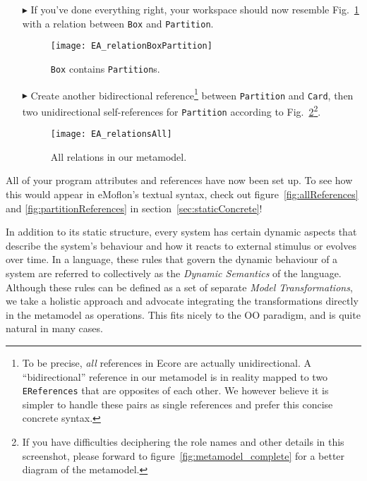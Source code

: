 \begin{enumerate}

\item[$\blacktriangleright$] If you've done everything right, your workspace should now resemble Fig.~\ref{fig:ereference_completed} with a relation between \texttt{Box} and \texttt{Partition}.

\begin{figure}[htbp]
	\centering
  \texttt{[image: EA\_relationBoxPartition]}
	\caption{\texttt{Box} contains \texttt{Partition}s.}
	\label{fig:ereference_completed}
\end{figure}
\FloatBarrier


\item[$\blacktriangleright$] Create another bidirectional reference\footnote{To be precise, \emph{all} references in Ecore are actually unidirectional.
A ``bidirectional'' reference in our metamodel is in reality mapped to two \texttt{EReferences} that are opposites of each other.
We however believe it is simpler to handle these pairs as single references and prefer this concise concrete syntax.} between \texttt{Partition} and \texttt{Card}, then two unidirectional self-references for \texttt{Partition} according to Fig.~\ref{fig:ereferences_all}\footnote{If you have difficulties deciphering the role names and other details in this screenshot, please forward to figure~\ref{fig:metamodel_complete} for a better diagram of the metamodel.}.

\begin{figure}[htbp]
	\centering
  \texttt{[image: EA\_relationsAll]}
	\caption{All relations in our metamodel.}
	\label{fig:ereferences_all}
\end{figure}
\end{enumerate}
\FloatBarrier

All of your program attributes and references have now been set up. To see how this would appear in eMoflon's textual syntax, check out figure~\ref{fig:allReferences} and \ref{fig:partitionReferences} in section~\ref{sec:staticConcrete}!

\vfill
\pagebreak

In addition to its static structure, every system has certain dynamic aspects that describe the system's behaviour and how it reacts to external stimulus or evolves over time.
In a language, these rules that govern the dynamic behaviour of a system are referred to collectively as the \emph{Dynamic Semantics} of the language.
Although these rules can be defined as a set of separate \emph{Model Transformations}, we take a holistic approach and advocate integrating the transformations directly in the metamodel as operations.
This fits nicely to the OO paradigm, and is quite natural in many cases.

